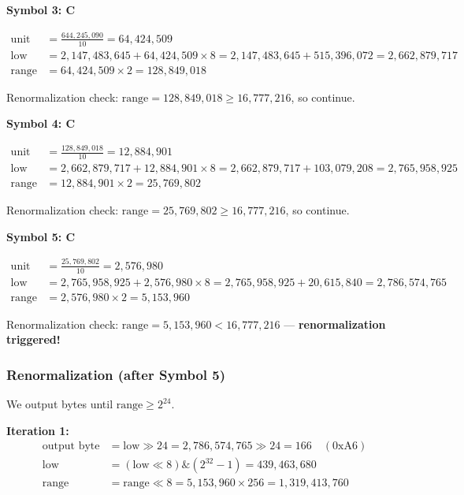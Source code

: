 \documentclass[12pt]{article}
\begin{document}
\vspace{2mm}
\textbf{Symbol 3: C}

\begin{align*}
\text{unit} &= \frac{644{,}245{,}090}{10} = 64{,}424{,}509 \\
\text{low} &= 2{,}147{,}483{,}645 + 64{,}424{,}509 \times 8 = 2{,}147{,}483{,}645 + 515{,}396{,}072 = 2{,}662{,}879{,}717 \\
\text{range} &= 64{,}424{,}509 \times 2 = 128{,}849{,}018
\end{align*}

Renormalization check: $\text{range} = 128{,}849{,}018 \ge 16{,}777{,}216$, so continue.

\vspace{2mm}
\textbf{Symbol 4: C}

\begin{align*}
\text{unit} &= \frac{128{,}849{,}018}{10} = 12{,}884{,}901 \\
\text{low} &= 2{,}662{,}879{,}717 + 12{,}884{,}901 \times 8 = 2{,}662{,}879{,}717 + 103{,}079{,}208 = 2{,}765{,}958{,}925 \\
\text{range} &= 12{,}884{,}901 \times 2 = 25{,}769{,}802
\end{align*}

Renormalization check: $\text{range} = 25{,}769{,}802 \ge 16{,}777{,}216$, so continue.

\vspace{2mm}
\textbf{Symbol 5: C}

\begin{align*}
\text{unit} &= \frac{25{,}769{,}802}{10} = 2{,}576{,}980 \\
\text{low} &= 2{,}765{,}958{,}925 + 2{,}576{,}980 \times 8 = 2{,}765{,}958{,}925 + 20{,}615{,}840 = 2{,}786{,}574{,}765 \\
\text{range} &= 2{,}576{,}980 \times 2 = 5{,}153{,}960
\end{align*}

Renormalization check: $\text{range} = 5{,}153{,}960 < 16{,}777{,}216$ — \textbf{renormalization triggered!}

\subsubsection*{Renormalization (after Symbol 5)}

We output bytes until $\text{range} \ge 2^{24}$.

\textbf{Iteration 1:}
\begin{align*}
\text{output byte} &= \text{low} \gg 24 = 2{,}786{,}574{,}765 \gg 24 = 166 \quad (\text{0xA6}) \\
\text{low} &= (\text{low} \ll 8) \mathrel{\&} (2^{32}-1) = 439{,}463{,}680 \\
\text{range} &= \text{range} \ll 8 = 5{,}153{,}960 \times 256 = 1{,}319{,}413{,}760
\end{align*}
\end{document}
